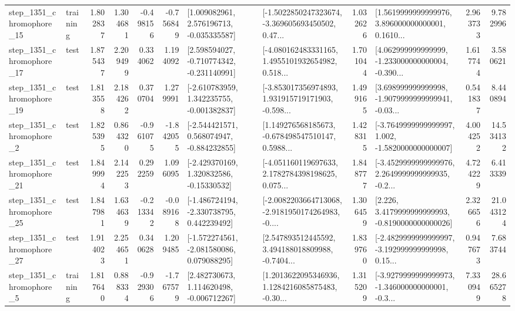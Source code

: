 \begin{tabular}{llrrrrllrlrr}
 step\_1351\_chromophore\_15 &  training &      1.802837 &    1.304681 &     -0.498156 & -0.756849 &    [1.009082961, 2.576196713, -0.035335587] &  [-1.5022850247323674, -3.369605693450502, 0.47... &       1.032626 &  [1.5619999999999976, 3.896000000000001, 0.1610... &            2.963733 &          9.782996 \\
 step\_1351\_chromophore\_17 &      test &      1.875437 &    2.209499 &      0.334062 &  1.194092 &   [2.598594027, -0.710774342, -0.231140991] &  [-4.080162483331165, 1.4955101932654982, 0.518... &       1.701044 &  [4.062999999999999, -1.233000000000004, -0.390... &            1.617744 &          3.580621 \\
 step\_1351\_chromophore\_19 &      test &      1.813558 &    2.184262 &      0.370704 &  1.279991 &   [-2.610783959, 1.342235755, -0.001382837] &  [-3.853017356974893, 1.931915719171903, -0.598... &       1.499165 &  [3.698999999999998, -1.9079999999999941, -0.03... &            0.541837 &          8.440894 \\
  step\_1351\_chromophore\_2 &      test &      1.825395 &    0.864320 &     -0.961075 & -1.842055 &   [-2.544421571, 0.568074947, -0.884232855] &  [1.149276568185673, -0.678498547510147, 0.5988... &       1.428315 &  [-3.7649999999999997, 1.002, -1.5820000000000007] &            4.004252 &         14.534132 \\
 step\_1351\_chromophore\_21 &      test &      1.849994 &    2.142253 &      0.292259 &  1.096095 &    [-2.429370169, 1.320832586, -0.15330532] &  [-4.051160119697633, 2.1782784398198625, 0.075... &       1.848777 &  [-3.4529999999999976, 2.2649999999999935, -0.2... &            4.724229 &          6.413339 \\
 step\_1351\_chromophore\_25 &      test &      1.847981 &    1.634639 &     -0.213342 & -0.089168 &   [-1.486724194, -2.330738795, 0.442239492] &  [-2.0082203664713068, -2.9181950174264983, -0.... &       1.306459 &   [2.226, 3.4179999999999993, -0.8190000000000026] &            2.326656 &         21.043124 \\
 step\_1351\_chromophore\_27 &      test &      1.914023 &    2.254651 &      0.340628 &  1.209485 &   [-1.572274561, -2.081580086, 0.079088295] &  [2.547893512445592, 3.494188018809988, -0.7404... &       1.839760 &  [-2.4829999999999997, -3.192999999999998, 0.15... &            0.947673 &          7.683744 \\
  step\_1351\_chromophore\_5 &  training &      1.817640 &    0.888334 &     -0.929306 & -1.767579 &    [2.482730673, 1.114620498, -0.006712267] &  [1.2013622095346936, 1.1284216085875483, -0.30... &       1.315209 &  [-3.9279999999999973, -1.346000000000001, -0.3... &            7.330949 &         28.665278 \\

\end{tabular}
